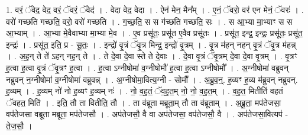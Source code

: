 \documentclass[17pt]{extarticle}
\begin{document}
1. वरं॒ ॅवेद॒ वेद॒ वरं॒ ॅवरं॒ ॅवेद॑ । . वेदा वेद॒ वेदा । . ऐन॑ मेन॒ मैन᳚म् । . ए॒नं॒ ॅवरो॒ वर॑ एन मेनं॒ ॅवरः॑ । . वरो॑ गच्छति गच्छति॒ वरो॒ वरो॑ गच्छति । . ग॒च्छ॒ति॒ स स ग॑च्छति गच्छति॒ सः । . स आ॒भ्या मा॒भ्याꣳ स स आ॒भ्याम् । . आ॒भ्या मे॒वैवाभ्या मा॒भ्या मे॒व । . ए॒व प्रसू॑तः॒ प्रसू॑त ए॒वैव प्रसू॑तः । . प्रसू॑त॒ इन्द्र॒ इन्द्रः॒ प्रसू॑तः॒ प्रसू॑त॒ इन्द्रः॑ । . प्रसू॑त॒ इति॒ प्र - सू॒तः॒ । . इन्द्रो॑ वृ॒त्रं ॅवृ॒त्र मिन्द्र॒ इन्द्रो॑ वृ॒त्रम् । . वृ॒त्र म॑हन् नहन् वृ॒त्रं ॅवृ॒त्र म॑हन्न् । . अ॒ह॒न् ते ते॑ ऽहन् नह॒न् ते । . ते दे॒वा दे॒वा स्ते ते दे॒वाः । . दे॒वा वृ॒त्रं ॅवृ॒त्रम् दे॒वा दे॒वा वृ॒त्रम् । . वृ॒त्रꣳ ह॒त्वा ह॒त्वा वृ॒त्रं ॅवृ॒त्रꣳ ह॒त्वा । . ह॒त्वा ऽग्नीषोमा॑ व॒ग्नीषोमौ॑ ह॒त्वा ह॒त्वा ऽग्नीषोमौ᳚ । . अ॒ग्नीषोमा॑ वब्रुवन् नब्रुवन् न॒ग्नीषोमा॑ व॒ग्नीषोमा॑ वब्रुवन्न् । . अ॒ग्नीषोमा॒वित्य॒ग्नी - सोमौ᳚ । . अ॒ब्रु॒व॒न्॒. ह॒व्यꣳ ह॒व्य म॑ब्रुवन् नब्रुवन्. ह॒व्यम् । . ह॒व्यम् नो॑ नो ह॒व्यꣳ ह॒व्यम् नः॑ । . नो॒ व॒ह॒तं॒ ॅव॒ह॒त॒म् नो॒ नो॒ व॒ह॒त॒म् । . व॒ह॒त॒ मितीति॑ वहतं ॅवहत॒ मिति॑ । . इति॒ तौ ता वितीति॒ तौ । . ता व॑ब्रूता मब्रूता॒म् तौ ता व॑ब्रूताम् । . अ॒ब्रू॒ता॒ मप॑तेजसा॒ वप॑तेजसा वब्रूता मब्रूता॒ मप॑तेजसौ । . अप॑तेजसौ॒ वै वा अप॑तेजसा॒ वप॑तेजसौ॒ वै । . अप॑तेजसा॒वित्यप॑ - ते॒ज॒सौ॒ । \newline
\end{document}
